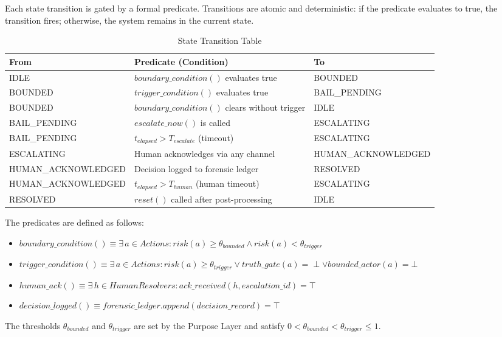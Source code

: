 Each state transition is gated by a formal predicate. Transitions are atomic and deterministic: if the predicate evaluates to true, the transition fires; otherwise, the system remains in the current state.

\begin{table}[H]
\centering
\caption{State Transition Table}
\label{tab:transitions}
\begin{tabular}{@{}lp{5.5cm}l@{}}
\toprule
\textbf{From} & \textbf{Predicate (Condition)} & \textbf{To} \\
\midrule
IDLE & $boundary\_condition()$ evaluates true & BOUNDED \\
BOUNDED & $trigger\_condition()$ evaluates true & BAIL\_PENDING \\
BOUNDED & $boundary\_condition()$ clears without trigger & IDLE \\
BAIL\_PENDING & $escalate\_now()$ is called & ESCALATING \\
BAIL\_PENDING & $t_{elapsed} > T_{escalate}$ (timeout) & ESCALATING \\
ESCALATING & Human acknowledges via any channel & HUMAN\_ACKNOWLEDGED \\
HUMAN\_ACKNOWLEDGED & Decision logged to forensic ledger & RESOLVED \\
HUMAN\_ACKNOWLEDGED & $t_{elapsed} > T_{human}$ (human timeout) & ESCALATING \\
RESOLVED & $reset()$ called after post-processing & IDLE \\
\bottomrule
\end{tabular}
\end{table}

The predicates are defined as follows:

\begin{itemize}
  \item $boundary\_condition() \equiv \exists\, a \in Actions : risk(a) \geq \theta_{bounded} \land risk(a) < \theta_{trigger}$
  \item $trigger\_condition() \equiv \exists\, a \in Actions : risk(a) \geq \theta_{trigger} \lor truth\_gate(a) = \perp \lor bounded\_actor(a) = \bot$
  \item $human\_ack() \equiv \exists\, h \in HumanResolvers : ack\_received(h, escalation\_id) = \top$
  \item $decision\_logged() \equiv forensic\_ledger.append(decision\_record) = \top$
\end{itemize}

The thresholds $\theta_{bounded}$ and $\theta_{trigger}$ are set by the Purpose Layer and satisfy $0 < \theta_{bounded} < \theta_{trigger} \leq 1$.

